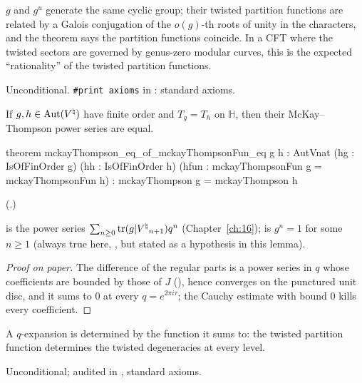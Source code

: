 \begin{physics}
$g$ and $g^u$ generate the same cyclic group; their twisted partition functions are related by a Galois conjugation of
the $o(g)$-th roots of unity in the characters, and the theorem says the partition functions coincide.  In a CFT where the
twisted sectors are governed by genus-zero modular curves, this is the expected ``rationality'' of the twisted partition
functions.
\end{physics}
\begin{status}Unconditional.  \texttt{\#print axioms} in : standard
axioms.\end{status}

\begin{theorem}\label{ch22:thm:coeff}
If $g,h\in\operatorname{Aut}({V^{\natural}})$ have finite order and $T_g=T_h$ on $\mathbb H$, then their McKay--Thompson power series are equal.
\end{theorem}
\begin{leancode}
theorem mckayThompson_eq_of_mckayThompsonFun_eq {g h : AutVnat} (hg : IsOfFinOrder g)
    (hh : IsOfFinOrder h) (hfun : mckayThompsonFun g = mckayThompsonFun h) :
    mckayThompson g = mckayThompson h
\end{leancode}
(.)
\begin{dictionary}
 is the power series $\sum_{n\ge0}\operatorname{tr}(g|{V^{\natural}}_{n+1})q^n$ (Chapter~\ref{ch:16}); 
is $g^n=1$ for some $n\ge1$ (always true here, , but stated as a hypothesis in this lemma).
\end{dictionary}
\begin{proof}[Proof on paper]
The difference of the regular parts is a power series in $q$ whose coefficients are bounded by those of $J$
(), hence converges on the punctured unit disc, and it sums to $0$ at every
$q=e^{2\pi i\tau}$; the Cauchy estimate  with bound $0$ kills every coefficient.
\end{proof}
\begin{physics}A $q$-expansion is determined by the function it sums to: the twisted partition function determines the
twisted degeneracies at every level.\end{physics}
\begin{status}Unconditional; audited in , standard axioms.\end{status}

